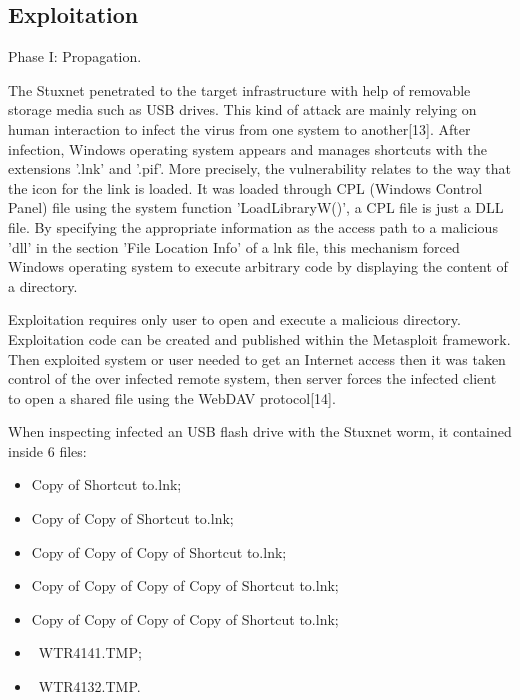 \documentclass[conference]{IEEEtran}
\begin{document}
\subsection{Exploitation}
Phase I: Propagation.

The Stuxnet penetrated to the target infrastructure with help of removable storage media such as USB drives. This kind of attack are mainly relying on human interaction to infect the virus from one system to another[13].  After infection, Windows operating system appears and manages shortcuts with the extensions '.lnk' and '.pif'. More precisely, the vulnerability relates to the way that the icon for the link is loaded. It was loaded through CPL (Windows Control Panel)
file using the system function 'LoadLibraryW()', a CPL file is just a DLL file.  By specifying the appropriate information as the access path to a malicious 'dll' in the section 'File Location Info' of a lnk file, this mechanism  forced  Windows operating system to execute arbitrary code by displaying the content of a directory.

Exploitation  requires only user to open and execute a malicious directory. Exploitation code can be created and published within the Metasploit framework. Then exploited system or user needed to get an Internet access then it was taken control of the  over infected remote system, then  server forces the infected client to open a shared file using the WebDAV protocol[14].

When  inspecting infected an USB flash drive with the Stuxnet worm, it contained inside 6 files:
\begin{itemize}
   \item  Copy of Shortcut to.lnk;
   \item  Copy of Copy of Shortcut to.lnk;
   \item  Copy of Copy of Copy of Shortcut to.lnk;
   \item Copy of Copy of Copy of Copy of Shortcut to.lnk;
   \item  Copy of Copy of Copy of Copy of Shortcut to.lnk;
   \item ~WTR4141.TMP;
   \item  ~WTR4132.TMP.
\end{itemize}
\end{document}
